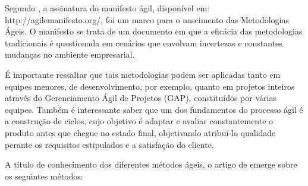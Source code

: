 Segundo , a assinatura do manifesto ágil, disponível em: \textsf{http://agilemanifesto.org/}, foi um marco para o nascimento das Metodologias Ágeis. O manifesto se trata de um documento em que a eficácia das metodologias tradicionais é questionada em cenários que envolvam incertezas e constantes mudanças no ambiente empresarial. 

É importante ressaltar que tais metodologias podem ser aplicadas tanto em equipes menores, de desenvolvimento, por exemplo, quanto em projetos inteiros através do Gerenciamento Ágil de Projetos (GAP), constituídos por várias equipes. Também é interessante saber que um dos fundamentos do processo ágil é a construção de ciclos, cujo objetivo é adaptar e avaliar constantemente o produto antes que chegue no estado final, objetivando atribuí-lo qualidade perante os requisitos estipulados e a satisfação do cliente.

A título de conhecimento dos diferentes métodos ágeis, o artigo de  emerge sobre os seguintes métodos:

